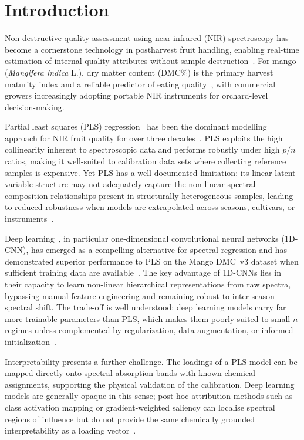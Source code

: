 \documentclass[preprint,12pt,hidelinks]{elsarticle}
\begin{document}
\section{Introduction}

Non-destructive quality assessment using near-infrared (NIR) spectroscopy
has become a cornerstone technology in postharvest fruit handling, enabling
real-time estimation of internal quality attributes without sample
destruction~\cite{walsh2020,pasquini2018}. For mango (\textit{Mangifera
indica} L.), dry matter content (DMC\%) is the primary harvest maturity
index and a reliable predictor of eating quality~\cite{saranwong2004}, with
commercial growers increasingly adopting portable NIR instruments for
orchard-level decision-making.

Partial least squares (PLS) regression~\cite{wold2001} has been the
dominant modelling approach for NIR fruit quality for over three
decades~\cite{anderson2020}. PLS exploits the high collinearity inherent
to spectroscopic data and performs robustly under high $p/n$ ratios, making
it well-suited to calibration data sets where collecting reference samples
is expensive. Yet PLS has a well-documented limitation: its linear latent
variable structure may not adequately capture the non-linear
spectral--composition relationships present in structurally heterogeneous
samples, leading to reduced robustness when models are extrapolated across
seasons, cultivars, or instruments~\cite{anderson2020b,mishra2021deep}.

Deep learning~\cite{goodfellow2016}, in particular one-dimensional convolutional neural networks
(1D-CNN), has emerged as a compelling alternative for spectral regression
and has demonstrated superior performance to PLS on the Mango DMC~v3
dataset when sufficient training data are
available~\cite{walsh2024,mishra2021synergistic}. The key advantage of
1D-CNNs lies in their capacity to learn non-linear hierarchical
representations from raw spectra, bypassing manual feature engineering and
remaining robust to inter-season spectral shift. The trade-off is well
understood: deep learning models carry far more trainable parameters than
PLS, which makes them poorly suited to small-$n$ regimes unless
complemented by regularization, data augmentation, or informed
initialization~\cite{passos2022,mishra2022hypes}.

Interpretability presents a further challenge. The loadings of a PLS model
can be mapped directly onto spectral absorption bands with known chemical
assignments, supporting the physical validation of the calibration. Deep
learning models are generally opaque in this sense; post-hoc attribution
methods such as class activation mapping or gradient-weighted saliency can
localise spectral regions of influence but do not provide the same
chemically grounded interpretability as a loading
vector~\cite{mishra2022hypes,passos2022perspectives}.
\end{document}
